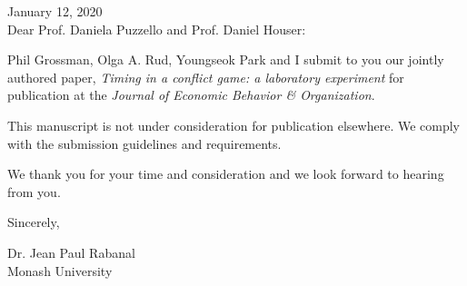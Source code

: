 \documentclass[11pt]{article}
\begin{document}
January 12, 2020 \\

Dear Prof. Daniela Puzzello and Prof. Daniel Houser:

Phil Grossman, Olga A. Rud, Youngseok Park and I submit to you our jointly authored paper, \textit{Timing in a conflict game: a laboratory experiment} for publication at the \textit{Journal of Economic Behavior \& Organization}.

This manuscript is not under consideration for publication elsewhere. We comply with the submission guidelines and requirements.

We thank you for your time and consideration and we look forward to hearing from you.

Sincerely,

Dr. Jean Paul Rabanal\\
Monash University
\end{document}
